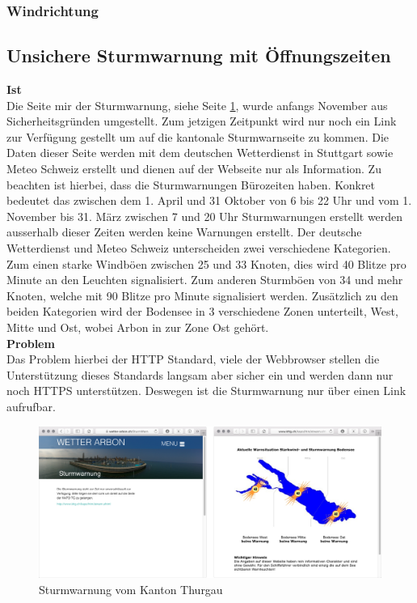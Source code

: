 \subsubsection*{Windrichtung}




\subsection{Unsichere Sturmwarnung mit Öffnungszeiten}
\textbf{Ist}\\
Die Seite mir der Sturmwarnung, siehe Seite \ref{img:sturm}, wurde anfangs November aus Sicherheitsgründen umgestellt. Zum jetzigen Zeitpunkt wird nur noch ein Link zur Verfügung gestellt um auf die kantonale Sturmwarnseite zu kommen. Die Daten dieser Seite werden mit dem deutschen Wetterdienst in Stuttgart sowie Meteo Schweiz erstellt und dienen auf der Webseite nur als Information. Zu beachten ist hierbei, dass die Sturmwarnungen Bürozeiten haben. Konkret bedeutet das zwischen dem 1. April und 31 Oktober von 6 bis 22 Uhr und vom 1. November bis 31. März zwischen 7 und 20 Uhr Sturmwarnungen erstellt werden ausserhalb dieser Zeiten werden keine Warnungen erstellt. Der deutsche Wetterdienst und Meteo Schweiz unterscheiden zwei verschiedene Kategorien. Zum einen starke Windböen zwischen 25 und 33 Knoten, dies wird 40 Blitze pro Minute an den Leuchten signalisiert. Zum anderen Sturmböen von 34 und mehr Knoten, welche mit 90 Blitze pro Minute signalisiert werden. Zusätzlich zu den beiden Kategorien wird der Bodensee in 3 verschiedene Zonen unterteilt, West, Mitte und Ost, wobei Arbon in zur Zone Ost gehört.\\
\textbf{Problem}\\

Das Problem hierbei der HTTP Standard, viele der Webbrowser stellen die Unterstützung dieses Standards langsam aber sicher ein und werden dann nur noch HTTPS unterstützen\cite{Mozilla:DeprecatingNon-SecureHTTP}. Deswegen ist die Sturmwarnung nur über einen Link aufrufbar. 


\begin{figure}[h!]
	\centering
	\includegraphics[width=1\linewidth]{img/sturm}
	\caption{Sturmwarnung vom Kanton Thurgau}
	\label{img:sturm}
\end{figure}


